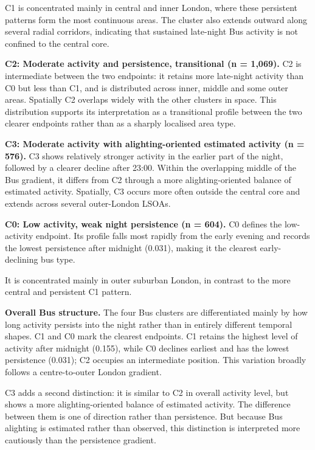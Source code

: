C1 is concentrated mainly in central and inner London, where these persistent patterns form the most continuous areas. The cluster also extends outward along several radial corridors, indicating that sustained late-night Bus activity is not confined to the central core.

\textbf{C2: Moderate activity and persistence, transitional (n = 1,069).} C2 is intermediate between the two endpoints: it retains more late-night activity than C0 but less than C1, and is distributed across inner, middle and some outer areas. Spatially C2 overlaps widely with the other clusters in space. This distribution supports its interpretation as a transitional profile between the two clearer endpoints rather than as a sharply localised area type.

\textbf{C3: Moderate activity with alighting-oriented estimated activity (n = 576).} C3 shows relatively stronger activity in the earlier part of the night, followed by a clearer decline after 23:00. Within the overlapping middle of the Bus gradient, it differs from C2 through a more alighting-oriented balance of estimated activity. Spatially, C3 occurs more often outside the central core and extends across several outer-London LSOAs.

\textbf{C0: Low activity, weak night persistence (n = 604).} C0 defines the low-activity endpoint. Its profile falls most rapidly from the early evening and records the lowest persistence after midnight (0.031), making it the clearest early-declining bus type.

It is concentrated mainly in outer suburban London, in contrast to the more central and persistent C1 pattern.

\textbf{Overall Bus structure.} The four Bus clusters are differentiated mainly by how long activity persists into the night rather than in entirely different temporal shapes. C1 and C0 mark the clearest endpoints. C1 retains the highest level of activity after midnight (0.155), while C0 declines earliest and has the lowest persistence (0.031); C2 occupies an intermediate position. This variation broadly follows a centre-to-outer London gradient.

C3 adds a second distinction: it is similar to C2 in overall activity level, but shows a more alighting-oriented balance of estimated activity. The difference between them is one of direction rather than persistence. But because Bus alighting is estimated rather than observed, this distinction is interpreted more cautiously than the persistence gradient.

